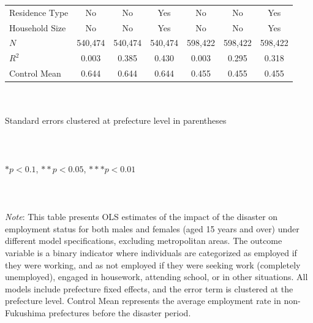 \documentclass[serif, aspectratio=169]{beamer}
\newcommand{\employmentprobabilitylinks}{%
    \vfill %
    \hfill %
    {\small %
        \hyperlink{employed_placebo}{\beamerbutton{Placebo test}} \,
    }
}
\begin{document}
\begin{frame}[label=employed]
\begin{table}[htbp]
\begin{tabular}{@{}l*{6}{c}@{}}
Residence Type&       No         &       No         &      Yes         &       No         &       No         &      Yes         \\
Household Size&       No         &       No         &      Yes         &       No         &       No         &      Yes         \\
$\textit{N}$&  540,474         &  540,474         &  540,474         &  598,422         &  598,422         &  598,422         \\
$\textit{R}^2$&    0.003         &    0.385         &    0.430         &    0.003         &    0.295         &    0.318         \\
Control Mean&    0.644         &    0.644         &    0.644         &    0.455         &    0.455         &    0.455         \\
\bottomrule
\end{tabular}
\\\\{\linewidth}{\tiny Standard errors clustered at prefecture level in parentheses}\\\\
\\\\{\linewidth}{\tiny $*p<0.1$, $**p<0.05$, $***p<0.01$}\\\\
\\\\{\linewidth}{\tiny \textit{Note}: This table presents OLS estimates of the impact of the disaster on employment status for both males and females (aged 15 years and over) under different model specifications, excluding metropolitan areas. The outcome variable is a binary indicator where individuals are categorized as employed if they were working, and as not employed if they were seeking work (completely unemployed), engaged in housework, attending school, or in other situations. All models include prefecture fixed effects, and the error term is clustered at the prefecture level. Control Mean represents the average employment rate in non-Fukushima prefectures before the disaster period.}
\end{table}

\vspace{-2.2cm}
\employmentprobabilitylinks


\end{frame}

\end{document}
